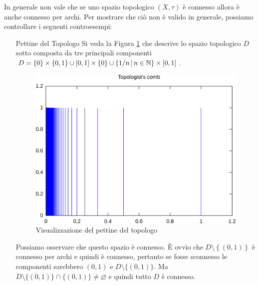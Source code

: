 \begin{remark}
	In generale non vale che se uno spazio topologico $(X,\tau)$ è connesso allora è anche connesso per archi. Per mostrare che ciò non è valido in generale, possiamo controllare i seguenti controesempi:
	\begin{enumerate}
		\item[Pettine del Topologo] Si veda la Figura \ref{fig:comb_topology} che descrive lo spazio topologico $D$ sotto composta da tre principali componenti $D = \left\{0\right\} \times \left\{0,1\right\} \cup \left[0,1\right]\times \left\{0\right\} \cup \left\{1/n \,\middle|\, n \in \mathbb{N} \right\} \times \left[0,1\right]$. 
		
		\begin{figure}[h]
			\centering
			\includegraphics[width=0.5\linewidth]{images/topologia_generale/g160}
			\caption{Visualizzazione del pettine del topologo}
			\label{fig:comb_topology}
		\end{figure}
		
		
		Possiamo osservare che questo spazio è connesso. È ovvio che $D \setminus \left\{(0,1)\right\}$ è connesso per archi e quindi è connesso, pertanto se fosse sconnesso le componenti sarebbero $(0,1)$ e $D \setminus \{(0,1)\}$. Ma $\overline{D \setminus \{(0,1)\}} \cap \{(0,1)\} \neq \varnothing$ e quindi tutto $D$ è connesso. 
		

\end{enumerate}
\end{remark}
